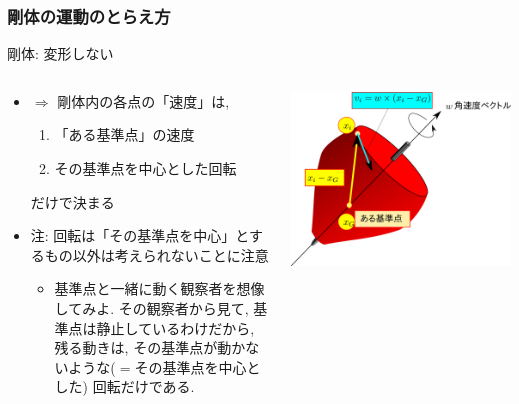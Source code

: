 \documentclass[10pt,dvipdfmx]{beamer}
\newcommand{\aka}[1]{{\color{red}#1}}
\begin{document}
\begin{frame}
\frametitle{剛体の運動のとらえ方}
剛体: 変形しない
\begin{columns}
\begin{column}{0.6\textwidth}
\begin{itemize}
\item $\Rightarrow$ 剛体内の各点の「速度」は,
\begin{enumerate}
\item \aka{「ある基準点」の速度}
\item \aka{その基準点を中心とした回転}
\end{enumerate}
だけで決まる

\item 注: 回転は「その基準点を中心」とするもの以外は考えられないことに注意
  \begin{itemize}
  \item[] \footnotesize{基準点と一緒に動く観察者を想像してみよ. その観察者から見て,
      基準点は静止しているわけだから, 
      残る動きは, その基準点が動かないような($=$その基準点を中心とした)
      回転だけである.}
  \end{itemize}
\end{itemize}
\end{column}

\begin{column}{0.4\textwidth}
\includegraphics[width=\textwidth]{out/pdf/svg/v_w_r.pdf}
\end{column}

\end{columns}
\end{frame}
\end{document}
